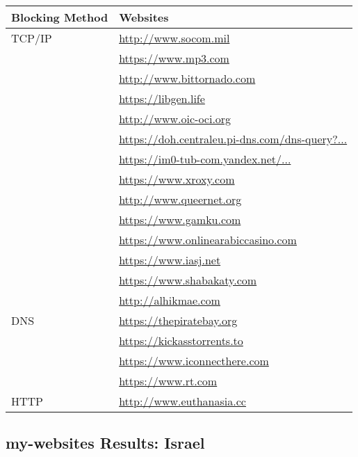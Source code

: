 \begin{tabular}{ll} 
\toprule
\textbf{Blocking Method} & \textbf{Websites} \\
\midrule
TCP/IP & \url{http://www.socom.mil} \\
       & \url{https://www.mp3.com} \\
       & \url{http://www.bittornado.com} \\
       & \url{https://libgen.life} \\
       & \url{http://www.oic-oci.org} \\
       & \url{https://doh.centraleu.pi-dns.com/dns-query?...} \\
       & \url{https://im0-tub-com.yandex.net/...} \\
       & \url{https://www.xroxy.com} \\
       & \url{http://www.queernet.org} \\
       & \url{https://www.gamku.com} \\
       & \url{https://www.onlinearabiccasino.com} \\
       & \url{https://www.iasj.net} \\
       & \url{https://www.shabakaty.com} \\
       & \url{http://alhikmae.com} \\
\midrule
DNS    & \url{https://thepiratebay.org} \\
       & \url{https://kickasstorrents.to} \\
       & \url{https://www.iconnecthere.com} \\
       & \url{https://www.rt.com} \\
\midrule
HTTP   & \url{http://www.euthanasia.cc} \\
\bottomrule
\end{tabular}

\vspace{1cm}

\subsection{my-websites Results: Israel}

